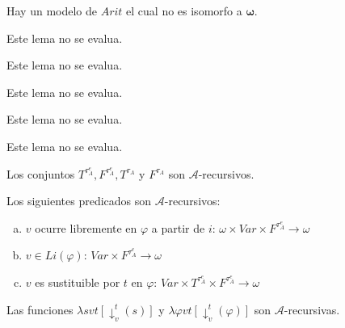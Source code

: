   \begin{proposition} \label{proposition_92}
    \PN Hay un modelo de $Arit$ el cual no es isomorfo a $\pmb{\omega}$.
  \end{proposition}

  \begin{lemma}
    \PN Este lema no se evalua.
  \end{lemma}

  \begin{lemma}
    \PN Este lema no se evalua.
  \end{lemma}

  \begin{lemma}
    \PN Este lema no se evalua.
  \end{lemma}

  \begin{lemma}
    \PN Este lema no se evalua.
  \end{lemma}

  \begin{lemma}
    \PN Este lema no se evalua.
  \end{lemma}

  \begin{lemma} \label{lemma_98}
    \PN Los conjuntos $T^{\tau_{A}^{e}}, F^{\tau_{A}^{e}}, T^{\tau_{A}}$ y $F^{\tau_{A}}$ son $\mathcal{A}$-recursivos.
  \end{lemma}

  \begin{lemma} \label{lemma_99}
    \PN Los siguientes predicados son $\mathcal{A}$-recursivos:
    \begin{enumerate}[(a)]
      \item \CL $v$ ocurre libremente en $\varphi$ a partir de $i$\CR: $\omega \times Var \times F^{\tau_{A}^{e}}
        \rightarrow \omega$
      \item \CL $v \in Li(\varphi)$\CR: $Var \times F^{\tau_{A}^{e}} \rightarrow \omega$
      \item \CL $v$ es sustituible por $t$ en $\varphi$\CR: $Var \times T^{\tau_{A}^{e}} \times F^{\tau_{A}^{e}}
        \rightarrow \omega$
    \end{enumerate}
  \end{lemma}

  \begin{lemma} \label{lemma_100}
    \PN Las funciones $\lambda svt[\downarrow_{v}^{t}(s)]$ y $\lambda \varphi vt[\downarrow_{v}^{t}(\varphi)]$ son
    $\mathcal{A}$-recursivas.
  \end{lemma}

